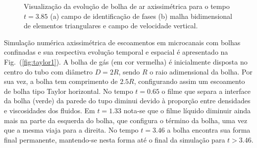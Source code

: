 \documentclass[a4paper,portuges,12pt]{article}
\begin{document}
\begin{figure}[!h]
	\begin{center}
   	\hspace{0.7cm}
	\end{center}
   \caption{Visualização da evolução de bolha de ar axissimétrica para
   o tempo $t=3.85$ (a) campo de identificação de fases (b) malha
   bidimensional de elementos triangulares e campo de velocidade
   vertical.} 
   \label{fig:micro2} 
\end{figure}

Simulação numérica axissimétrica de escoamentos em microcanais com
bolhas confinadas e sua respectiva evolução temporal e espacial é
apresentado na Fig.~(\ref{fig:taylor1}). A bolha de gás (em cor
vermelha) é inicialmente disposta no centro do tubo com diâmetro $D=2R$,
sendo $R$ o raio adimensional da bolha. Por sua vez, a bolha tem
comprimento de $2.5R$, configurando assim um escoamento de bolha tipo
Taylor horizontal. No tempo $t=0.65$ o filme que separa a interface da
bolha (verde) da parede do tupo diminui devido à proporção entre
densidades e viscosidades dos fluidos. Em $t=1.33$ nota-se que o filme
líquido diminuir ainda mais na parte da esquerda do bolha, que configura
o término da bolha, uma vez que a mesma viaja para a direita. No tempo
$t=3.46$ a bolha encontra sua forma final permanente, mantendo-se nesta
forma até o final da simulação para $t>3.46$.
\end{document}

